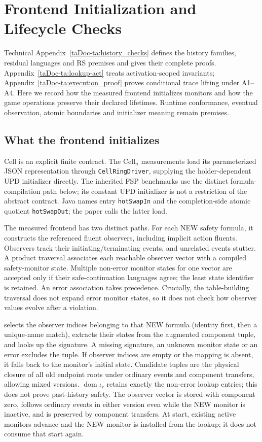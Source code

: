 \documentclass[11pt]{article}
\begin{document}
\section{Frontend Initialization and Lifecycle Checks}
\label{supp:runtime}
Technical Appendix~\ref{taDoc-ta:history_checks} defines the history families, residual languages and RS premises and gives their complete proofs. Appendix~\ref{taDoc-ta:lookup-act} treats activation-scoped invariants; Appendix~\ref{taDoc-ta:execution_proof} proves conditional trace lifting under A1--A4. Here we record how the measured frontend initializes monitors and how the game operations preserve their declared lifetimes. Runtime conformance, eventual observation, atomic boundaries and initializer meaning remain premises.

\subsection{What the frontend initializes}
Cell is an explicit finite contract. The Cell$_n$ measurements load its parameterized JSON representation through \texttt{CellRingDriver}, supplying the holder-dependent UPD initializer directly. The inherited FSP benchmarks use the distinct formula-compilation path below; its constant UPD initializer is not a restriction of the abstract contract.
Java names entry \texttt{hotSwapIn} and the completion-side atomic quotient \texttt{hotSwapOut}; the paper calls the latter load.

The measured frontend has two distinct paths. For each NEW safety formula, it constructs the referenced fluent observers, including implicit action fluents. Observers track their initiating/terminating events, and unrelated events stutter. A product traversal associates each reachable observer vector with a compiled safety-monitor state. Multiple non-error monitor states for one vector are accepted only if their safe-continuation languages agree; the least state identifier is retained. An error association takes precedence. Crucially, the table-building traversal does not expand error monitor states, so it does not check how observer values evolve after a violation.

 selects the observer indices belonging to that NEW formula (identity first, then a unique-name match), extracts their states from the augmented component tuple, and looks up the signature. A missing signature, an unknown monitor state or an error excludes the tuple. If observer indices are empty or the mapping is absent, it falls back to the monitor's initial state. Candidate tuples are the physical closure of all old endpoint roots under ordinary events and component transfers, allowing mixed versions. $\operatorname{dom}\iota_r$ retains exactly the non-error lookup entries; this does not prove past-history safety. The observer vector is stored with component zero, follows ordinary events in either version even while the NEW monitor is inactive, and is preserved by component transfers. At start, existing active monitors advance and the NEW monitor is installed from the lookup; it does not consume that start again.
\end{document}
